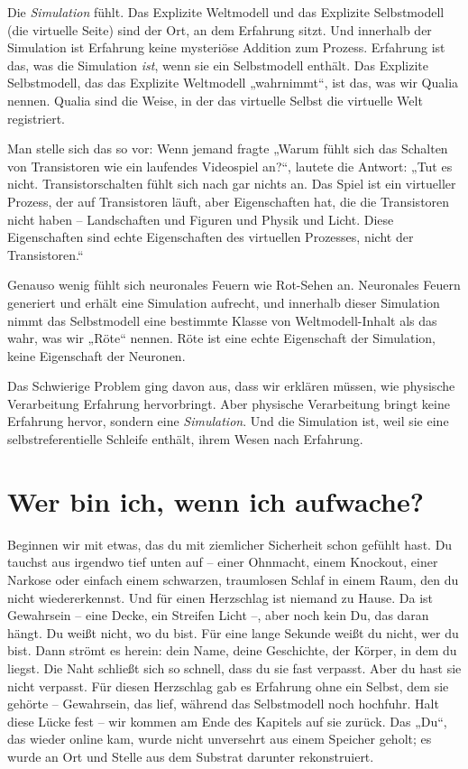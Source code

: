 \documentclass[11pt, twoside, openright]{book}
\begin{document}
Die \textit{Simulation} fühlt. Das Explizite Weltmodell und das Explizite Selbstmodell (die virtuelle Seite) sind der Ort, an dem Erfahrung sitzt. Und innerhalb der Simulation ist Erfahrung keine mysteriöse Addition zum Prozess. Erfahrung ist das, was die Simulation \textit{ist}, wenn sie ein Selbstmodell enthält. Das Explizite Selbstmodell, das das Explizite Weltmodell „wahrnimmt“, ist das, was wir Qualia nennen. Qualia sind die Weise, in der das virtuelle Selbst die virtuelle Welt registriert.

Man stelle sich das so vor: Wenn jemand fragte „Warum fühlt sich das Schalten von Transistoren wie ein laufendes Videospiel an?“, lautete die Antwort: „Tut es nicht. Transistorschalten fühlt sich nach gar nichts an. Das Spiel ist ein virtueller Prozess, der auf Transistoren läuft, aber Eigenschaften hat, die die Transistoren nicht haben -- Landschaften und Figuren und Physik und Licht. Diese Eigenschaften sind echte Eigenschaften des virtuellen Prozesses, nicht der Transistoren.“

Genauso wenig fühlt sich neuronales Feuern wie Rot-Sehen an. Neuronales Feuern generiert und erhält eine Simulation aufrecht, und innerhalb dieser Simulation nimmt das Selbstmodell eine bestimmte Klasse von Weltmodell-Inhalt als das wahr, was wir „Röte“ nennen. Röte ist eine echte Eigenschaft der Simulation, keine Eigenschaft der Neuronen.

Das Schwierige Problem ging davon aus, dass wir erklären müssen, wie physische Verarbeitung Erfahrung hervorbringt. Aber physische Verarbeitung bringt keine Erfahrung hervor, sondern eine \textit{Simulation}. Und die Simulation ist, weil sie eine selbstreferentielle Schleife enthält, ihrem Wesen nach Erfahrung.

\section*{Wer bin ich, wenn ich aufwache?}

Beginnen wir mit etwas, das du mit ziemlicher Sicherheit schon gefühlt hast. Du tauchst aus irgendwo tief unten auf -- einer Ohnmacht, einem Knockout, einer Narkose oder einfach einem schwarzen, traumlosen Schlaf in einem Raum, den du nicht wiedererkennst. Und für einen Herzschlag ist niemand zu Hause. Da ist Gewahrsein -- eine Decke, ein Streifen Licht --, aber noch kein Du, das daran hängt. Du weißt nicht, wo du bist. Für eine lange Sekunde weißt du nicht, wer du bist. Dann strömt es herein: dein Name, deine Geschichte, der Körper, in dem du liegst. Die Naht schließt sich so schnell, dass du sie fast verpasst. Aber du hast sie nicht verpasst. Für diesen Herzschlag gab es Erfahrung ohne ein Selbst, dem sie gehörte -- Gewahrsein, das lief, während das Selbstmodell noch hochfuhr. Halt diese Lücke fest -- wir kommen am Ende des Kapitels auf sie zurück. Das „Du“, das wieder online kam, wurde nicht unversehrt aus einem Speicher geholt; es wurde an Ort und Stelle aus dem Substrat darunter rekonstruiert.
\end{document}
